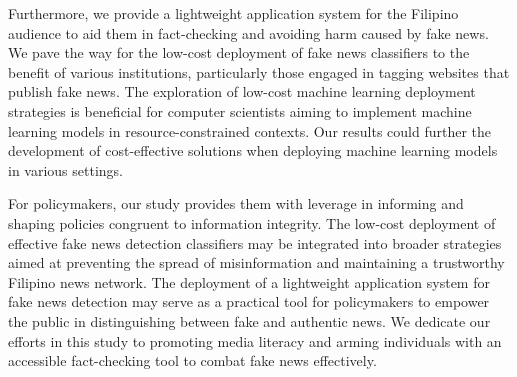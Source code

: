 Furthermore, we provide a lightweight application system for the Filipino audience to aid them in fact-checking and avoiding harm caused by fake news. We pave the way for the low-cost deployment of fake news classifiers to the benefit of various institutions, particularly those engaged in tagging websites that publish fake news. The exploration of low-cost machine learning deployment strategies is beneficial for computer scientists aiming to implement machine learning models in resource-constrained contexts. Our results could further the development of cost-effective solutions when deploying machine learning models in various settings.

For policymakers, our study provides them with leverage in informing and shaping policies congruent to information integrity. The low-cost deployment of effective fake news detection classifiers may be integrated into broader strategies aimed at preventing the spread of misinformation and maintaining a trustworthy Filipino news network. The deployment of a lightweight application system for fake news detection may serve as a practical tool for policymakers to empower the public in distinguishing between fake and authentic news. We dedicate our efforts in this study to promoting media literacy and arming individuals with an accessible fact-checking tool to combat fake news effectively.
